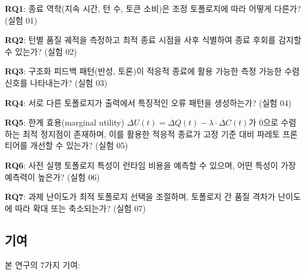 \documentclass[a4paper,11pt]{article}
\begin{document}
\textbf{RQ1}: 종료 역학(지속 시간, 턴 수, 토큰 소비)은 조정 토폴로지에 따라 어떻게 다른가? (실험 01)

\textbf{RQ2}: 턴별 품질 궤적을 측정하고 최적 종료 시점을 사후 식별하여 종료 후회를 감지할 수 있는가? (실험 02)

\textbf{RQ3}: 구조화 피드백 패턴(반성, 토론)이 적응적 종료에 활용 가능한 측정 가능한 수렴 신호를 나타내는가? (실험 03)

\textbf{RQ4}: 서로 다른 토폴로지가 출력에서 특징적인 오류 패턴을 생성하는가? (실험 04)

\textbf{RQ5}: 한계 효용(marginal utility) $\Delta U(t) = \Delta Q(t) - \lambda \cdot \Delta C(t)$가 0으로 수렴하는 최적 정지점이 존재하며, 이를 활용한 적응적 종료가 고정 기준 대비 파레토 프론티어를 개선할 수 있는가? (실험 05)

\textbf{RQ6}: 사전 실행 토폴로지 특성이 런타임 비용을 예측할 수 있으며, 어떤 특성이 가장 예측력이 높은가? (실험 06)

\textbf{RQ7}: 과제 난이도가 최적 토폴로지 선택을 조절하며, 토폴로지 간 품질 격차가 난이도에 따라 확대 또는 축소되는가? (실험 07)

\subsection{기여}

본 연구의 7가지 기여:
\end{document}
